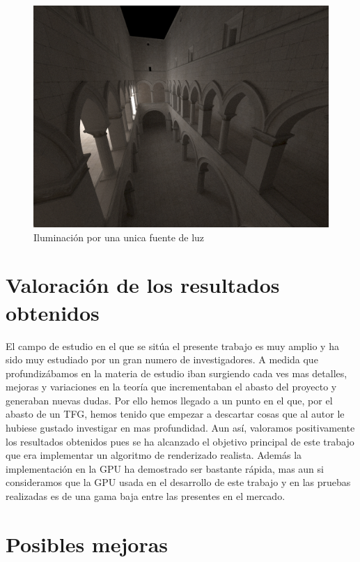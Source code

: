 \begin{figure}
\centering
\includegraphics[width=5in]{single_light_sponza.png}
\caption{Iluminación por una unica fuente de luz}
\end{figure}

\clearpage

\section{Valoración de los resultados obtenidos}


El campo de estudio en el que se sitúa el presente trabajo es muy amplio y ha sido muy estudiado por un gran numero de investigadores. A medida que profundizábamos en la materia de estudio iban surgiendo cada ves mas detalles, mejoras y variaciones en la teoría que incrementaban el abasto del proyecto y generaban nuevas dudas. Por ello hemos llegado a un punto en el que, por el abasto de un TFG, hemos tenido que empezar a descartar cosas que al autor le hubiese gustado investigar en mas profundidad. Aun así, valoramos positivamente los resultados obtenidos pues se ha alcanzado el objetivo principal de este trabajo que era implementar un algoritmo de renderizado realista. Además la implementación en la GPU ha demostrado ser bastante rápida, mas aun si consideramos que la GPU usada en el desarrollo de este trabajo y en las pruebas realizadas es de una gama baja entre las presentes en el mercado.

\clearpage

\section{Posibles mejoras}

